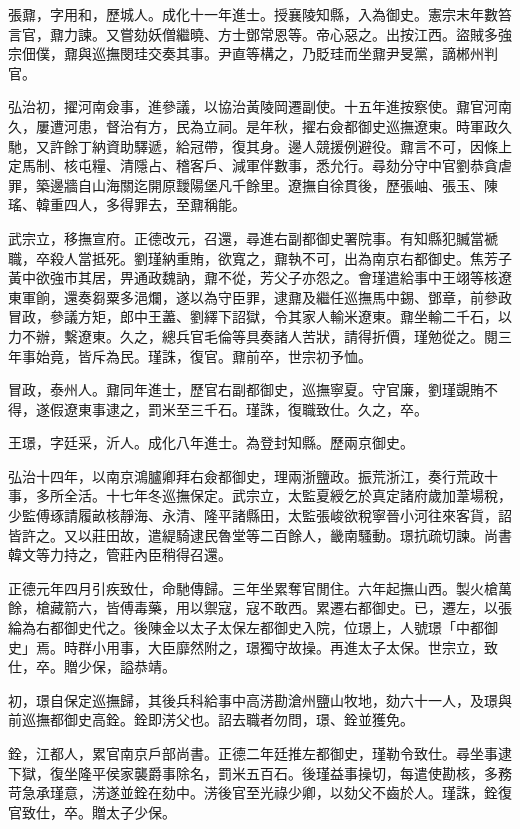 \begin{pinyinscope}
張鼐，字用和，歷城人。成化十一年進士。授襄陵知縣，入為御史。憲宗末年數笞言官，鼐力諫。又嘗劾妖僧繼曉、方士鄧常恩等。帝心惡之。出按江西。盜賊多強宗佃僕，鼐與巡撫閔珪交奏其事。尹直等構之，乃貶珪而坐鼐尹旻黨，謫郴州判官。

弘治初，擢河南僉事，進參議，以協治黃陵岡遷副使。十五年進按察使。鼐官河南久，屢遭河患，督治有方，民為立祠。是年秋，擢右僉都御史巡撫遼東。時軍政久馳，又許餘丁納資助驛遞，給冠帶，復其身。邊人競援例避役。鼐言不可，因條上定馬制、核屯糧、清隱占、稽客戶、減軍伴數事，悉允行。尋劾分守中官劉恭貪虐罪，築邊牆自山海關迄開原靉陽堡凡千餘里。遼撫自徐貫後，歷張岫、張玉、陳瑤、韓重四人，多得罪去，至鼐稱能。

武宗立，移撫宣府。正德改元，召還，尋進右副都御史署院事。有知縣犯贓當褫職，卒殺人當抵死。劉瑾納重賄，欲寬之，鼐執不可，出為南京右都御史。焦芳子黃中欲強市其居，畀通政魏訥，鼐不從，芳父子亦怨之。會瑾遣給事中王翊等核遼東軍餉，還奏芻粟多浥爛，遂以為守臣罪，逮鼐及繼任巡撫馬中錫、鄧章，前參政冒政，參議方矩，郎中王藎、劉繹下詔獄，令其家人輸米遼東。鼐坐輸二千石，以力不辦，繫遼東。久之，總兵官毛倫等具奏諸人苦狀，請得折價，瑾勉從之。閱三年事始竟，皆斥為民。瑾誅，復官。鼐前卒，世宗初予恤。

冒政，泰州人。鼐同年進士，歷官右副都御史，巡撫寧夏。守官廉，劉瑾覬賄不得，遂假遼東事逮之，罰米至三千石。瑾誅，復職致仕。久之，卒。

王璟，字廷采，沂人。成化八年進士。為登封知縣。歷兩京御史。

弘治十四年，以南京鴻臚卿拜右僉都御史，理兩浙鹽政。振荒浙江，奏行荒政十事，多所全活。十七年冬巡撫保定。武宗立，太監夏綬乞於真定諸府歲加葦場稅，少監傅琢請履畝核靜海、永清、隆平諸縣田，太監張峻欲稅寧晉小河往來客貨，詔皆許之。又以莊田故，遣緹騎逮民魯堂等二百餘人，畿南騷動。璟抗疏切諫。尚書韓文等力持之，管莊內臣稍得召還。

正德元年四月引疾致仕，命馳傳歸。三年坐累奪官閒住。六年起撫山西。製火槍萬餘，槍藏箭六，皆傅毒藥，用以禦寇，寇不敢西。累遷右都御史。已，遷左，以張綸為右都御史代之。後陳金以太子太保左都御史入院，位璟上，人號璟「中都御史」焉。時群小用事，大臣靡然附之，璟獨守故操。再進太子太保。世宗立，致仕，卒。贈少保，謚恭靖。

初，璟自保定巡撫歸，其後兵科給事中高淓勘滄州鹽山牧地，劾六十一人，及璟與前巡撫都御史高銓。銓即淓父也。詔去職者勿問，璟、銓並獲免。

銓，江都人，累官南京戶部尚書。正德二年廷推左都御史，瑾勒令致仕。尋坐事逮下獄，復坐隆平侯家襲爵事除名，罰米五百石。後瑾益事操切，每遣使勘核，多務苛急承瑾意，淓遂並銓在劾中。淓後官至光祿少卿，以劾父不齒於人。瑾誅，銓復官致仕，卒。贈太子少保。


\end{pinyinscope}
